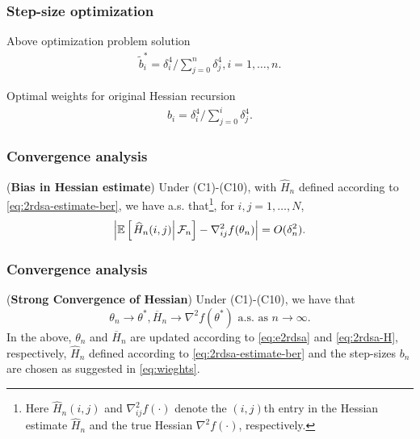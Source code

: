 \begin{frame}
\begin{small}
\frametitle{\centering Step-size optimization}
\begin{block}{Above optimization problem solution}
\begin{align}
\tilde b_i^* = \delta_i^{4}/\sum \limits_{j=0}^{n} \delta_j^{4}, i=1,\ldots,n.
\end{align}
\end{block}
\begin{block}{Optimal weights for original Hessian recursion}
\begin{align}
\label{eq:wieghts}
b_i  = \delta_i^{4}/\sum\limits_{j=0}^{i} \delta_j^{4}.
\end{align}
\end{block}
\end{small}
\end{frame}

\begin{frame}
\begin{small}
\frametitle{\centering Convergence analysis}

\begin{lemma}(\textbf{Bias in Hessian estimate})
\label{lemma:2rdsa-bias}
Under (C1)-(C10), with $\widehat H_n$ defined according to \eqref{eq:2rdsa-estimate-ber}, we have a.s. that\footnote{Here $\widehat H_n(i,j)$ and $\nabla^2_{ij}f(\cdot)$ denote the $(i,j)$th entry in the Hessian estimate $\widehat H_n$ and the true Hessian $\nabla^2 f(\cdot)$, respectively.}, for $i,j = 1,\ldots,N$,
\begin{align}
\left|\mathbb{E}\left[
\left. \widehat H_n(i,j) \right| \mathcal{F}_n \right] - \nabla^2_{ij} f(\theta_n)\right| = O(\delta_n^2).
\end{align} 
\end{lemma}
\end{small}
\end{frame}


\begin{frame}
\begin{small}
\frametitle{\centering Convergence analysis}
\begin{theorem}(\textbf{Strong Convergence of Hessian})
\label{thm:2rdsa-H}
Under (C1)-(C10), we have that 
$$\theta_n \rightarrow \theta^*, \overline H_n \rightarrow \nabla^2 f(\theta^*) \text{ a.s. as } n\rightarrow \infty.$$ 
In the above, $\theta_n$ and $\overline H_n$ are updated according to \eqref{eq:e2rdsa} and \eqref{eq:2rdsa-H}, respectively, $\widehat H_n$ defined according to \eqref{eq:2rdsa-estimate-ber} and the step-sizes $b_n$ are chosen as suggested in \eqref{eq:wieghts}. 
\end{theorem}
\end{small}
\end{frame}


